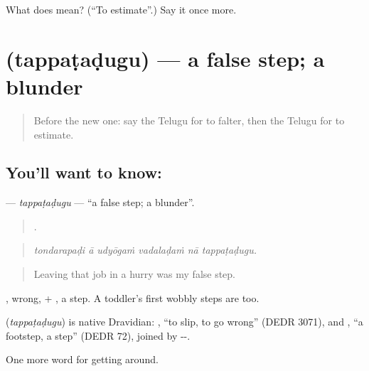 \begin{tcolorbox}[breakable,colback=teal!4,colframe=teal!35!black,title={Before you move on}]
What does   mean? (\textquotedblleft{}To estimate\textquotedblright{}.) Say it once more.
\end{tcolorbox}
\section[\texorpdfstring{\te{తప్పటడుగు} (tappaṭaḍugu)}{తప్పటడుగు (tappaṭaḍugu)}]{ (tappaṭaḍugu) — a false step; a blunder}

\label{lesson:TE-C492-tappatadugu}



\begin{quote}
Before the new one: say the Telugu for to falter, then the Telugu for to estimate.
\end{quote}

\subsection*{You'll want to know: }
\textbf{} — \emph{tappaṭaḍugu} — \textquotedblleft{}a false step; a blunder\textquotedblright{}.

\begin{quote}
     .
\end{quote}

\begin{quote}
\emph{tondarapaḍi ā udyōgaṁ vadalaḍaṁ nā tappaṭaḍugu.}
\end{quote}

\begin{quote}
Leaving that job in a hurry was my false step.
\end{quote}

, wrong, + , a step. A toddler's first wobbly steps are  too.

\begin{cousinweb}
\textbf{} (\emph{tappaṭaḍugu}) is native Dravidian: , \textquotedblleft{}to slip, to go wrong\textquotedblright{} (DEDR 3071), and , \textquotedblleft{}a footstep, a step\textquotedblright{} (DEDR 72), joined by --.
\end{cousinweb}

\begin{grammarlens}[title={What you've built}]
One more word for getting around.
\end{grammarlens}

